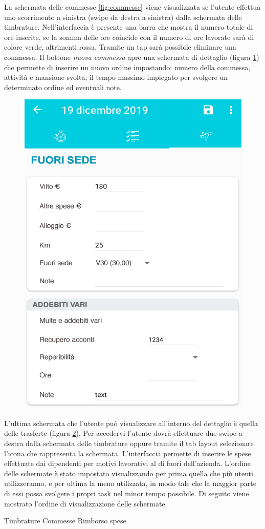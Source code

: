 \documentclass[12pt]{report}
\begin{document}
\begin{multicols}{2}
\begin{figure}[H]
		\caption{}
		\label{fig:commessedettaglio}
	\end{figure}
\end{multicols}
La schermata delle commesse \ref{fig:commesse} viene visualizzata se l'utente effettua uno scorrimento a sinistra (swipe da destra a sinistra) dalla schermata delle timbrature.
Nell'interfaccia è presente una barra che mostra il numero totale di ore inserite, se la somma delle ore coincide con il numero di ore lavorate sarà di colore verde, altrimenti rossa.
Tramite un tap sarà possibile eliminare una commessa. Il bottone \textit{nuova commessa} apre una schermata di dettaglio (figura \ref{fig:commessedettaglio}) che permette di inserire un nuovo ordine impostando: numero della commessa, attività e mansione svolta, il tempo massimo impiegato per svolgere un determinato ordine ed eventuali note.

\begin{figure}[!h]
	\centering
	\includegraphics[width=0.4\linewidth]{immagini/trasferte}
	\caption{}
	\label{fig:trasferte}
\end{figure}
L'ultima schermata che l'utente può visualizzare all'interno del dettaglio è quella delle trasferte (figura \ref{fig:trasferte}). Per accedervi l'utente dovrà effettuare due swipe a destra dalla schermata delle timbrature oppure tramite il tab layout selezionare l'icona che rappresenta la schermata. L'interfaccia permette di inserire le spese effettuate dai dipendenti per motivi lavorativi al di fuori dell'azienda.
\newpage
L'ordine delle schermate è stato impostato visualizzando per prima quella che più utenti utilizzeranno, e per ultima la meno utilizzata, in modo tale che la maggior parte di essi possa svolgere i propri task nel minor tempo possibile. Di seguito viene mostrato l'ordine di visualizzazione delle schermate.
	\begin{center}
	Timbrature \textrightarrow{} Commesse \textrightarrow{} Rimborso spese
	\end{center}
\end{document}
